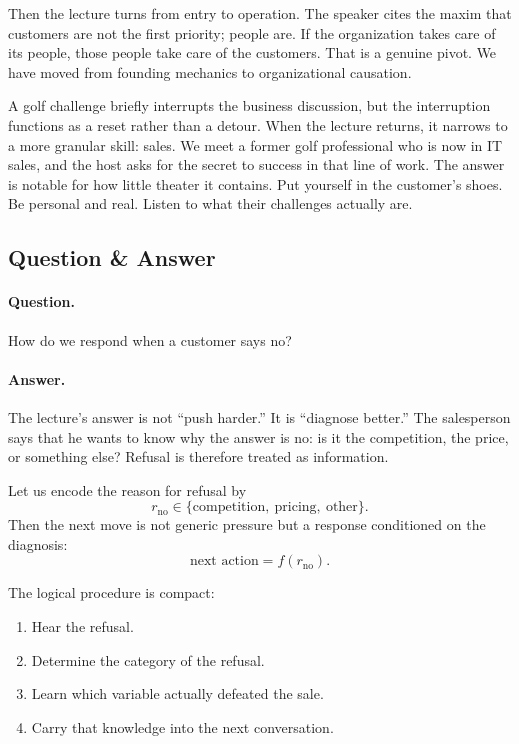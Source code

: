 Then the lecture turns from entry to operation. The speaker cites the maxim that customers are not the first priority; people are. If the organization takes care of its people, those people take care of the customers. That is a genuine pivot. We have moved from founding mechanics to organizational causation.

A golf challenge briefly interrupts the business discussion, but the interruption functions as a reset rather than a detour. When the lecture returns, it narrows to a more granular skill: sales. We meet a former golf professional who is now in IT sales, and the host asks for the secret to success in that line of work. The answer is notable for how little theater it contains. Put yourself in the customer's shoes. Be personal and real. Listen to what their challenges actually are.

\subsection{Question \& Answer}

\paragraph{Question.} How do we respond when a customer says no?

\paragraph{Answer.} The lecture's answer is not ``push harder.'' It is ``diagnose better.'' The salesperson says that he wants to know why the answer is no: is it the competition, the price, or something else? Refusal is therefore treated as information.

Let us encode the reason for refusal by
\begin{equation}
r_{\text{no}} \in \{\text{competition},\ \text{pricing},\ \text{other}\}.
\end{equation}
Then the next move is not generic pressure but a response conditioned on the diagnosis:
\begin{equation}
\text{next action} = f\!\left(r_{\text{no}}\right).
\end{equation}

The logical procedure is compact:
\begin{enumerate}
\item Hear the refusal.
\item Determine the category of the refusal.
\item Learn which variable actually defeated the sale.
\item Carry that knowledge into the next conversation.
\end{enumerate}

